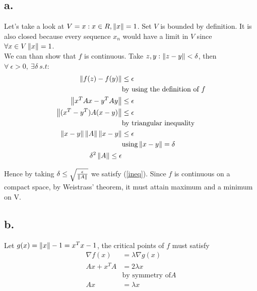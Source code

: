 \begin{homeworkProblem}

\subsection{a.}

Let's take a look at $V = {x: x \in R, \left\lVert x\right\rVert = 1}$. Set $V$ is bounded by definition. It is also closed because every sequence $x_n$ would have a limit in $V$ since $\forall x \in V \left\lVert x\right\rVert = 1$. \\
We can than show that $f$ is continuous. Take $z, y: \left\lVert z - y\right\rVert < \delta$, then $\forall  \ \epsilon > 0,  \ \exists \delta \ s.t$: 
\begin{equation} \label{ineq}
    \begin{split}
        \left\lVert f(z) - f(y)\right\rVert & \leq \epsilon \\
        & \text{by using the definition of } f \\
        \left\lVert x^TAx - y^T A y\right\rVert & \leq \epsilon \\
        \left\lVert(x^T- y^T) A (x-y)\right\rVert & \leq \epsilon \\
        & \text{by triangular inequality} \\
        \left\lVert x-y\right\rVert \left\lVert A\right\rVert \left\lVert x-y\right\rVert & \leq \epsilon \\
        & \text{using} \left\lVert x-y\right\rVert = \delta \\
        \delta^2 \left\lVert A\right\rVert \leq \epsilon
    \end{split}
\end{equation}

Hence by taking $\delta \leq \sqrt{\frac{\epsilon}{\left\lVert A\right\rVert}}$ we satisfy (\ref{ineq}). 
Since $f$ is continuous on a compact space, by Weistrass' theorem, it must attain maximum and a minimum on V.

\subsection{b.}
Let $g(x) = \left\lVert x\right\rVert - 1 = x^Tx - 1$, the critical points of $f$ must satisfy
\begin{equation} \label{eigen_space}
    \begin{split}
        \nabla f(x) & = \lambda \nabla g(x)\\
        Ax + x^T A  & = 2 \lambda x \\
        & \text{by symmetry of} A \\
        Ax & = \lambda x
    \end{split}
\end{equation}


\end{homeworkProblem}
